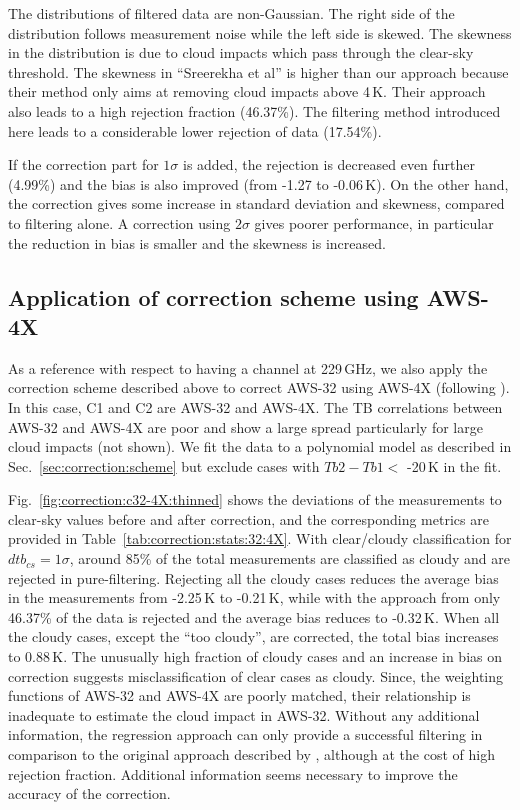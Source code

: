 \documentclass[12pt]{article}
\begin{document}
The distributions of filtered data are non-Gaussian. The right side of the
distribution follows measurement noise while the left side is skewed. The
skewness in the distribution is due to cloud impacts which pass through the
clear-sky threshold. The skewness in ``Sreerekha et al'' is higher than our approach because their method only aims at removing cloud impacts above 4\,K. Their approach also leads to a high rejection fraction (46.37\%). The filtering
method introduced here leads to a considerable lower rejection of data
(17.54\%).

If the correction part for $1\sigma$ is added, the rejection is decreased even further (4.99\%)
and the bias is also improved (from -1.27 to -0.06\,K). On the other hand, the
correction gives some increase in standard deviation and skewness, compared to
filtering alone. A correction using $2\sigma$ gives poorer performance, in particular the reduction in bias is smaller and the skewness is increased.


%
\subsection{Application of correction scheme using AWS-4X}
%

As a reference with respect to having a channel at 229\,GHz, we also apply the
correction scheme described above to correct AWS-32 using AWS-4X (following
\citet{rekha2012potential}). In this case, C1 and C2 are AWS-32 and AWS-4X. The
TB correlations between AWS-32 and AWS-4X are poor and show a large spread
particularly for large cloud impacts (not shown). We fit the data to a polynomial model as described in Sec.~\ref{sec:correction:scheme} but exclude cases with $Tb2-Tb1 <$ -20\,K in the fit.

Fig.~\ref{fig:correction:c32-4X:thinned} shows the deviations of the
measurements to clear-sky values before and after correction, and the
corresponding metrics are provided in Table~\ref{tab:correction:stats:32:4X}.
With clear/cloudy classification for $dtb_{cs} = 1\sigma$, around 85\% of the
total measurements are classified as cloudy and are rejected in pure-filtering.
Rejecting all the cloudy cases reduces the average bias in the measurements
from -2.25\,K to -0.21\,K, while with the approach from
\citet{rekha2012potential} only 46.37\% of the data is rejected and the average
bias reduces to -0.32\,K. When all the cloudy cases, except the ``too cloudy'',
are corrected, the total bias increases to 0.88\,K. The unusually high fraction
of cloudy cases and an increase in bias on correction suggests
misclassification of clear cases as cloudy. Since, the weighting functions of
AWS-32 and AWS-4X are poorly matched, their relationship is inadequate to
estimate the cloud impact in AWS-32. Without any additional information, the
regression approach can only provide a successful filtering in comparison to
the original approach described by \citet{rekha2012potential}, although at the
cost of high rejection fraction. Additional information seems necessary to improve
the accuracy of the correction.
\end{document}
